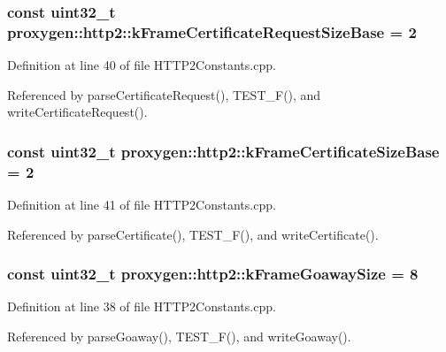 \subsubsection[{k\+Frame\+Certificate\+Request\+Size\+Base}]{\setlength{\rightskip}{0pt plus 5cm}const uint32\+\_\+t proxygen\+::http2\+::k\+Frame\+Certificate\+Request\+Size\+Base = 2}\label{namespaceproxygen_1_1http2_a445a53ca16efb379796a885aff7a678e}


Definition at line 40 of file H\+T\+T\+P2\+Constants.\+cpp.



Referenced by parse\+Certificate\+Request(), T\+E\+S\+T\+\_\+\+F(), and write\+Certificate\+Request().

\subsubsection[{k\+Frame\+Certificate\+Size\+Base}]{\setlength{\rightskip}{0pt plus 5cm}const uint32\+\_\+t proxygen\+::http2\+::k\+Frame\+Certificate\+Size\+Base = 2}\label{namespaceproxygen_1_1http2_ae20b9d98ecf437daa4f96a3bfc55d56c}


Definition at line 41 of file H\+T\+T\+P2\+Constants.\+cpp.



Referenced by parse\+Certificate(), T\+E\+S\+T\+\_\+\+F(), and write\+Certificate().

\subsubsection[{k\+Frame\+Goaway\+Size}]{\setlength{\rightskip}{0pt plus 5cm}const uint32\+\_\+t proxygen\+::http2\+::k\+Frame\+Goaway\+Size = 8}\label{namespaceproxygen_1_1http2_a2eb10ab5068320693be754992ae5574e}


Definition at line 38 of file H\+T\+T\+P2\+Constants.\+cpp.



Referenced by parse\+Goaway(), T\+E\+S\+T\+\_\+\+F(), and write\+Goaway().

